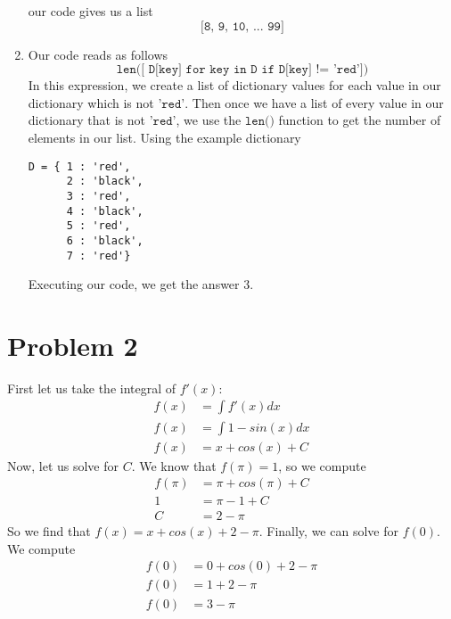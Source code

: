 \documentclass[12pt, letterpaper]{article}
\begin{document}
\begin{enumerate}[label=(\alph*)]
    our code gives us a list 
    \[
        \texttt{[8, 9, 10, ... 99]}
    \]  
    \item Our code reads as follows
    \[ 
    \texttt{len([ D[key] for key in D if D[key] != 'red'])}
    \]
    In this expression, we create a list of dictionary values for each value in our dictionary which is not 
    $\texttt{'red'}$. Then once we have a list of every value in our dictionary that is not $\texttt{'red'}$, we 
    use the $\texttt{len()}$ function to get the number of elements in our list. Using the example dictionary
\begin{lstlisting}
D = { 1 : 'red', 
      2 : 'black', 
      3 : 'red', 
      4 : 'black', 
      5 : 'red', 
      6 : 'black', 
      7 : 'red'}
\end{lstlisting}
    Executing our code, we get the answer 3. 
\end{enumerate}
\newpage

\noindent\makebox[\linewidth]{\rule{18cm}{0.4pt}}
\section*{Problem 2}
First let us take the integral of $f'(x)$:
\begin{align*}
    f(x) &= \int f'(x) dx \\
    f(x) &= \int 1 - sin(x) dx \\
    f(x) &= x + cos(x) + C
\end{align*}
Now, let us solve for $C$. We know that $f(\pi) = 1$, so we compute
\begin{align*}
    f(\pi) &= \pi + cos(\pi) + C \\
    1 &= \pi - 1 + C \\
    C &= 2 - \pi
\end{align*}
So we find that $f(x) = x + cos(x) + 2 - \pi$. Finally, we can solve for $f(0)$. We compute
\begin{align*}
    f(0) &= 0 + cos(0) + 2 - \pi \\
    f(0) &= 1 + 2 - \pi \\
    f(0) &= 3 - \pi
\end{align*}


\noindent\makebox[\linewidth]{\rule{18cm}{0.4pt}}
\end{document}
